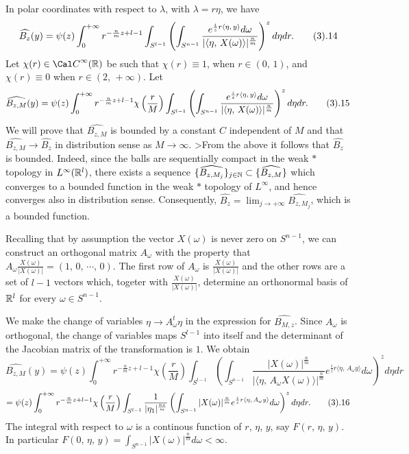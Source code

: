 In polar coordinates with respect to $\lambda$,
with $\lambda =r\eta$, we have
$$
\widehat{B_{z}}(y)=\psi(z)\int_{0}^{+\infty}
r^{-\frac{n}{m}z+l-1}
\int_{S^{l-1}}\left(
\int_{S^{n-1}}
\frac{ e^{\frac{i}{z}r\langle \eta,\, y \rangle}d\omega}
{|\langle \eta,\,X(\omega)\rangle|^{\frac{n}{m}}}
\right)^{z} d\eta dr.
\tag 3.14
$$
Let $\chi(r)\in {\Cal C}^{\infty}( {\Bbb R})$ be such that 
$\chi(r) \equiv 1$, when $r\in (0,\, 1)$, and 
$\chi(r) \equiv 0$ when $r \in (2,\, +\infty)$. Let
$$
\widehat{B_{z,M}}(y)= 
\psi(z)\int_{0}^{+\infty}
r^{-\frac{n}{m}z+l-1}\chi\left(\frac{r}{M}\right)
\int_{S^{l-1}}\left(
\int_{S^{n-1}}
\frac{ e^{\frac{i}{z}r\langle \eta,\, y \rangle}d\omega}
{|\langle \eta,\,X(\omega)\rangle|^{\frac{n}{m}}}
\right)^{z} d\eta dr.
\tag 3.15
$$
We will prove that  $\widehat{B_{z,M}}$ is bounded by a constant $C$
independent of $M$ and that 
$\widehat{B_{z,M}} \to \widehat{B_{z}}$ in distribution sense as 
$M\to \infty$.
>From the above it  follows that $\widehat{B_z}$  is bounded. 
Indeed, since the balls are sequentially compact in the 
weak $*$ topology  in $L^{\infty}( {\Bbb R}^l)$, there exists a sequence
$\{\widehat{B_{z,M_j}}\}_{j\in {\Bbb N}}\subset  
\{\widehat{B_{z,M}}\}$  which converges to a bounded function  in the
weak $*$ topology of $L^{\infty}$, and hence converges also in 
distribution sense.
Consequently, $\widehat{B_z}= \lim_{j\to +\infty}\widehat{B_{z, M_j}}$, 
which is a bounded function.

Recalling that  by  assumption 
the vector $X(\omega)$ is never  zero on $ S^{n-1}$, 
we can construct an orthogonal matrix $A_\omega$ with the 
property that $ A_\omega \frac{X(\omega)}{|X(\omega)|} = 
(1, \, 0, \, \cdots,\, 0)$.
The first row of $A_\omega$ is $\frac{X(\omega)}{|X(\omega)|} $ and the 
other rows  are a set of $l-1$ vectors which, 
togeter with $\frac{X(\omega)}{|X(\omega)|}$, 
determine an orthonormal  basis of ${\Bbb R}^l$ for every $\omega \in S^{n-1}$.

We make the change of variables 
$\eta\to A_\omega^t\eta$ in the expression for $\widehat{B_{M,z}}$.
Since $A_\omega$ is orthogonal, 
the change of variables maps $S^{l-1}$ into itself and the determinant of the 
Jacobian matrix of the transformation is $1$. We obtain
$$
\widehat{B_{z,M}}(y)=\psi(z)\int_{0}^{+\infty}
r^{-\frac{n}{m}z+l-1}\chi\left(\frac{r}{M}\right) 
\!\int_{S^{l-1}}\!\left(
\int_{S^{n-1}}\!\frac{|X(\omega)|^{\frac{n}{m}}}
{|\langle \eta,\,A_\omega X(\omega)\rangle|^{\frac{n}{m}}}
e^{\frac{i}{z}r\langle \eta,\, A_\omega y \rangle}d\omega \!\right)^{z} d\eta dr
$$
$$
=\psi(z)\int_{0}^{+\infty}
r^{-\frac{n}{m}z+l-1} \chi\left(\frac{r}{M}\right)
\int_{S^{l-1}} \frac{1}{|\eta_1|^{\frac{nz}{m}}}\left(
 \int_{S^{n-1}}{|X(\omega)|^{\frac{n}{m}}}
e^{\frac{i}{z}r\langle \eta,\, A_\omega y \rangle} d\omega\right)^{z}d\eta dr. 
\tag 3.16
$$
The integral with respect to $\omega$  is a continous function of  $r$, $\eta$, 
$y$, say $F(r,\,\eta,\, y)$. 
In particular $F(0,\,\eta,\,y)=  
\int_{S^{n-1}}{|X(\omega)|^{\frac{n}{m}}}d\omega<\infty.$ 

